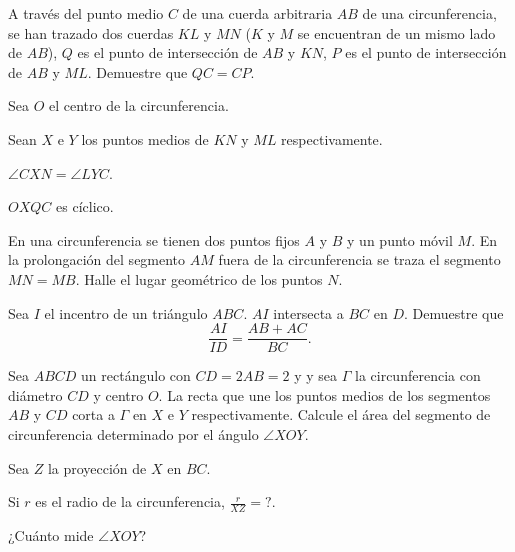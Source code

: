 \begin{problem}
A través del punto medio $C$ de una cuerda arbitraria $AB$ de una circunferencia,
se han trazado dos cuerdas $KL$ y $MN$
($K$ y $M$ se encuentran de un mismo lado de $AB$), $Q$ es el punto de intersección
de $AB$ y $KN$, $P$ es el punto de intersección de $AB$ y $ML$. Demuestre que $QC = CP$.
\begin{hints}
	\begin{hint}
		Sea $O$ el centro de la circunferencia.
	\end{hint}
	\begin{hint}
		Sean $X$ e $Y$ los puntos medios de $KN$ y $ML$ respectivamente.
	\end{hint}
	\begin{hint}
		$\angle CXN = \angle LYC$.
	\end{hint}
	\begin{hint}
		$OXQC$ es cíclico.
	\end{hint}
\end{hints}
\end{problem}

\begin{problem}
En una circunferencia se tienen dos puntos fijos
$A$ y $B$ y un punto móvil $M$. En la prolongación del segmento
$AM$ fuera de la circunferencia se traza el segmento $MN = MB$.
Halle el lugar geométrico de los puntos $N$.
\end{problem}

\begin{problem}
Sea $I$ el incentro de un triángulo $ABC$.
$AI$ intersecta a $BC$ en $D$. Demuestre que
\[\frac{AI}{ID} = \frac{AB + AC}{BC}.\]
\end{problem}

\begin{problem}[OMAPA 2025/3]
Sea $ABCD$ un rectángulo con $CD = 2AB = 2$ y
y sea $\Gamma$ la circunferencia con diámetro $CD$
y centro $O$.
La recta que une los puntos medios de
los segmentos $AB$ y $CD$ corta a $\Gamma$
en $X$ e $Y$ respectivamente.
Calcule el área del segmento de circunferencia
determinado por el ángulo $\angle XOY$.
\begin{hints}
	\begin{hint}
		Sea $Z$ la proyección de $X$ en $BC$.
	\end{hint}

	\begin{hint}
		Si $r$ es el radio de la circunferencia,
		$\frac r{XZ} = ?$.
	\end{hint}

	\begin{hint}
		¿Cuánto mide $\angle XOY$?
	\end{hint}
\end{hints}
\end{problem}

